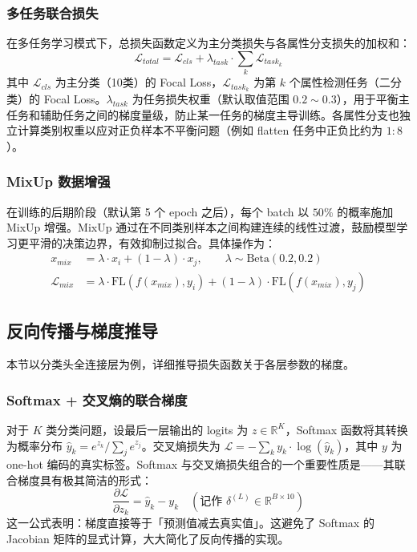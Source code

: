 \documentclass[11pt,a4paper]{ctexart}
\newcommand{\rb}[1]{\ensuremath{\mathbb{R}^{#1}}}
\begin{document}
\subsubsection{多任务联合损失}

在多任务学习模式下，总损失函数定义为主分类损失与各属性分支损失的加权和：
\begin{equation}
\mathcal{L}_{total} = \mathcal{L}_{cls} + \lambda_{task} \cdot \sum_{k} \mathcal{L}_{task_k}
\end{equation}
其中 $\mathcal{L}_{cls}$ 为主分类（10类）的 Focal Loss，$\mathcal{L}_{task_k}$ 为第 $k$ 个属性检测任务（二分类）的 Focal Loss。$\lambda_{task}$ 为任务损失权重（默认取值范围 $0.2 \sim 0.3$），用于平衡主任务和辅助任务之间的梯度量级，防止某一任务的梯度主导训练。各属性分支也独立计算类别权重以应对正负样本不平衡问题（例如 flatten 任务中正负比约为 $1:8$）。

\subsubsection{MixUp 数据增强}

在训练的后期阶段（默认第 5 个 epoch 之后），每个 batch 以 $50\%$ 的概率施加 MixUp 增强。MixUp 通过在不同类别样本之间构建连续的线性过渡，鼓励模型学习更平滑的决策边界，有效抑制过拟合。具体操作为：
\begin{align}
x_{mix} &= \lambda \cdot x_i + (1-\lambda) \cdot x_j,\qquad \lambda \sim \text{Beta}(0.2, 0.2) \\
\mathcal{L}_{mix} &= \lambda \cdot \mathrm{FL}(f(x_{mix}), y_i) + (1-\lambda) \cdot \mathrm{FL}(f(x_{mix}), y_j)
\end{align}

\subsection{反向传播与梯度推导}

本节以分类头全连接层为例，详细推导损失函数关于各层参数的梯度。

\subsubsection{Softmax + 交叉熵的联合梯度}

对于 $K$ 类分类问题，设最后一层输出的 logits 为 $z \in \rb{K}$，Softmax 函数将其转换为概率分布 $\hat{y}_k = e^{z_k} / \sum_j e^{z_j}$。交叉熵损失为 $\mathcal{L} = -\sum_k y_k \cdot \log(\hat{y}_k)$，其中 $y$ 为 one-hot 编码的真实标签。Softmax 与交叉熵损失组合的一个重要性质是——其联合梯度具有极其简洁的形式：
\begin{equation}
\frac{\partial \mathcal{L}}{\partial z_k} = \hat{y}_k - y_k \quad (\text{记作 } \delta^{(L)} \in \rb{B \times 10})
\end{equation}
这一公式表明：梯度直接等于「预测值减去真实值」。这避免了 Softmax 的 Jacobian 矩阵的显式计算，大大简化了反向传播的实现。
\end{document}
